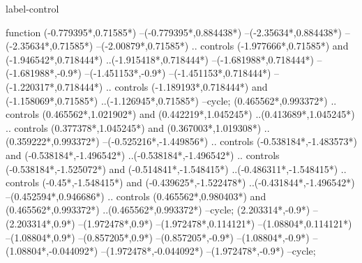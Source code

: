 {\begin{scope}[x=1mm,y=1mm,line width=\SCstroke mm,line cap=round,line join=round]
\begin{SCpart}{label-control}
\end{SCpart}
\begin{SCpart}{function}
 ({-0.779395*\SCF},{0.71585*\SCF})
--({-0.779395*\SCF},{0.884438*\SCF})
--({-2.35634*\SCF},{0.884438*\SCF})
--({-2.35634*\SCF},{0.71585*\SCF})
--({-2.00879*\SCF},{0.71585*\SCF})
.. controls ({-1.977666*\SCF},{0.71585*\SCF}) and ({-1.946542*\SCF},{0.718444*\SCF}) ..({-1.915418*\SCF},{0.718444*\SCF})
--({-1.681988*\SCF},{0.718444*\SCF})
--({-1.681988*\SCF},{-0.9*\SCF})
--({-1.451153*\SCF},{-0.9*\SCF})
--({-1.451153*\SCF},{0.718444*\SCF})
--({-1.220317*\SCF},{0.718444*\SCF})
.. controls ({-1.189193*\SCF},{0.718444*\SCF}) and ({-1.158069*\SCF},{0.71585*\SCF}) ..({-1.126945*\SCF},{0.71585*\SCF})
--cycle;
 ({0.465562*\SCF},{0.993372*\SCF})
.. controls ({0.465562*\SCF},{1.021902*\SCF}) and ({0.442219*\SCF},{1.045245*\SCF}) ..({0.413689*\SCF},{1.045245*\SCF})
.. controls ({0.377378*\SCF},{1.045245*\SCF}) and ({0.367003*\SCF},{1.019308*\SCF}) ..({0.359222*\SCF},{0.993372*\SCF})
--({-0.525216*\SCF},{-1.449856*\SCF})
.. controls ({-0.538184*\SCF},{-1.483573*\SCF}) and ({-0.538184*\SCF},{-1.496542*\SCF}) ..({-0.538184*\SCF},{-1.496542*\SCF})
.. controls ({-0.538184*\SCF},{-1.525072*\SCF}) and ({-0.514841*\SCF},{-1.548415*\SCF}) ..({-0.486311*\SCF},{-1.548415*\SCF})
.. controls ({-0.45*\SCF},{-1.548415*\SCF}) and ({-0.439625*\SCF},{-1.522478*\SCF}) ..({-0.431844*\SCF},{-1.496542*\SCF})
--({0.452594*\SCF},{0.946686*\SCF})
.. controls ({0.465562*\SCF},{0.980403*\SCF}) and ({0.465562*\SCF},{0.993372*\SCF}) ..({0.465562*\SCF},{0.993372*\SCF})
--cycle;
 ({2.203314*\SCF},{-0.9*\SCF})
--({2.203314*\SCF},{0.9*\SCF})
--({1.972478*\SCF},{0.9*\SCF})
--({1.972478*\SCF},{0.114121*\SCF})
--({1.08804*\SCF},{0.114121*\SCF})
--({1.08804*\SCF},{0.9*\SCF})
--({0.857205*\SCF},{0.9*\SCF})
--({0.857205*\SCF},{-0.9*\SCF})
--({1.08804*\SCF},{-0.9*\SCF})
--({1.08804*\SCF},{-0.044092*\SCF})
--({1.972478*\SCF},{-0.044092*\SCF})
--({1.972478*\SCF},{-0.9*\SCF})
--cycle;
\end{SCpart}
\end{scope}
}
